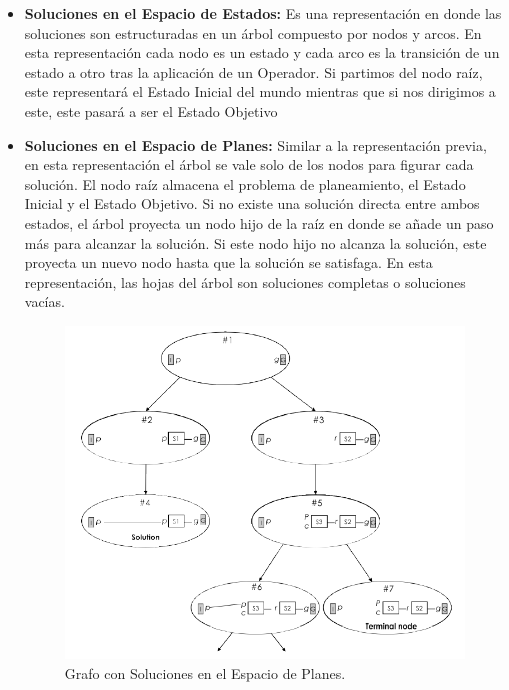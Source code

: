 \begin{itemize}

\item \textbf{Soluciones en el Espacio de Estados: } Es una representación en donde las soluciones son estructuradas en un árbol compuesto por nodos y arcos. En esta representación cada nodo es un estado y cada arco es la transición de un estado a otro tras la aplicación de un Operador. Si partimos del nodo raíz, este representará el Estado Inicial del mundo mientras que si nos dirigimos a este, este pasará a ser el Estado Objetivo

\item \textbf{Soluciones en el Espacio de Planes: }  Similar a la representación previa, en esta representación el árbol se vale solo de los nodos para figurar cada solución.  El nodo raíz almacena el problema de planeamiento, el Estado Inicial y el Estado Objetivo. Si no existe una solución directa entre ambos estados, el árbol proyecta un nodo hijo de la raíz en donde se añade un paso más para alcanzar la solución. Si este nodo hijo no alcanza la solución, este proyecta un nuevo nodo hasta que la solución se satisfaga. En esta representación, las hojas del árbol son soluciones completas o soluciones vacías.

\begin{figure}[tph!]
\centerline{\includegraphics[totalheight=7cm]{3}}
    \caption{Grafo con Soluciones en el Espacio de Planes. \cite{cheong2016planning}}
    \label{fig:ptest1}
\end{figure}


\end{itemize}

